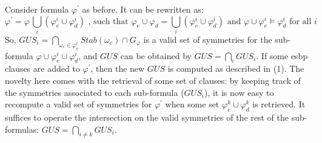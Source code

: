 Consider formula $\varphi^\prime$ as before. It can be rewritten as:
$$\varphi^\prime=\varphi \, \underset{i}{\bigcup}(\varphi_e^i \cup \varphi_d^i) \text{ , such that } \varphi_e \cup \varphi_d = \underset{i}{\bigcup}(\varphi_e^i \cup \varphi_d^i) \text{ and } \varphi \cup \varphi_e^i \models \varphi_d^i  \text{ for all } i$$
So, $GUS_i = \underset{\omega_e \in \varphi_e^i}{\bigcap}Stab(\omega_e) \cap G_{\varphi}$ is a valid set of symmetries for the sub-formula $\varphi \cup \varphi_e^i \cup \varphi_d^i$, and $GUS$ can be obtained by $GUS = \underset{i}{\bigcap} GUS_i$. If some esbp clauses are added to $\varphi^\prime$, then the new $GUS$ is computed as described in (1). The novelty here comes with the retrieval of some set of clauses: by keeping track of the symmetries associated to each sub-formula ($GUS_i$), it is now easy to recompute a valid set of symmetries for $\varphi^\prime$ when some set
$\varphi_e^k \cup \varphi_d^k$ is retrieved. It suffices to operate the intersection on the valid symmetries of the rest of the sub-formulas: $GUS = \underset{i \neq k}{\bigcap} GUS_i$.
